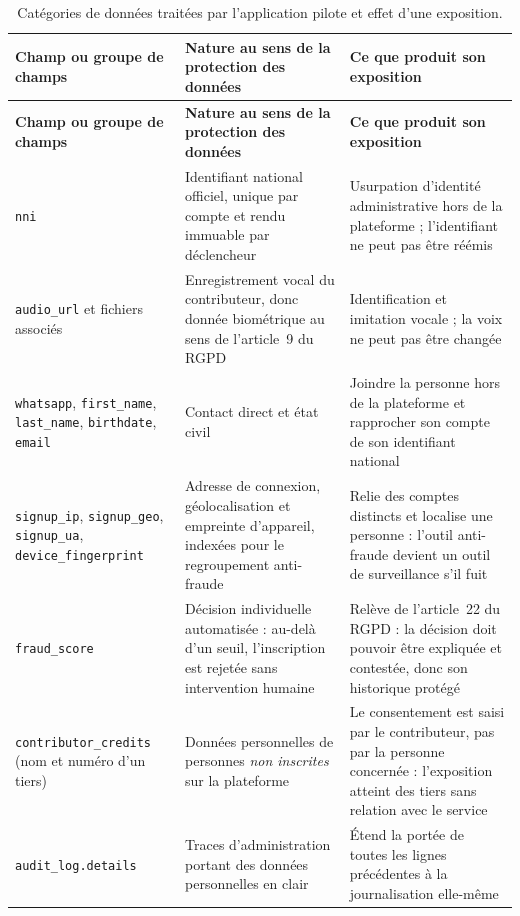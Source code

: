 {\setlength{\tabcolsep}{3pt}
\setlength{\LTpre}{4pt}\setlength{\LTpost}{4pt}
\begin{longtable}{|P{3.3cm}|P{4.3cm}|P{7.7cm}|}
\caption{Catégories de données traitées par l'application pilote et effet d'une exposition.}
\label{tab:sensibilite-elson}\\
\hline
\textbf{Champ ou groupe de champs} & \textbf{Nature au sens de la protection des données} &
  \textbf{Ce que produit son exposition} \\
\hline
\endfirsthead
\hline
\textbf{Champ ou groupe de champs} & \textbf{Nature au sens de la protection des données} &
  \textbf{Ce que produit son exposition} \\
\hline
\endhead
\hline
\endfoot
\texttt{nni} & Identifiant national officiel, unique par compte et rendu immuable par
déclencheur & Usurpation d'identité administrative hors de la plateforme ; l'identifiant ne
peut pas être réémis \\ \hline
\texttt{audio\_url} et fichiers associés & Enregistrement vocal du contributeur, donc donnée
biométrique au sens de l'article~9 du RGPD & Identification et imitation vocale ; la voix ne
peut pas être changée \\ \hline
\texttt{whatsapp}, \texttt{first\_name}, \texttt{last\_name}, \texttt{birthdate},
\texttt{email} & Contact direct et état civil & Joindre la personne hors de la plateforme et
rapprocher son compte de son identifiant national \\ \hline
\texttt{signup\_ip}, \texttt{signup\_geo}, \texttt{signup\_ua},
\texttt{device\_fingerprint} & Adresse de connexion, géolocalisation et empreinte d'appareil,
indexées pour le regroupement anti-fraude & Relie des comptes distincts et localise une
personne : l'outil anti-fraude devient un outil de surveillance s'il fuit \\ \hline
\texttt{fraud\_score} & Décision individuelle automatisée : au-delà d'un seuil, l'inscription
est rejetée sans intervention humaine & Relève de l'article~22 du RGPD : la décision doit
pouvoir être expliquée et contestée, donc son historique protégé \\ \hline
\texttt{contributor\_credits} (nom et numéro d'un tiers) & Données personnelles de personnes
\emph{non inscrites} sur la plateforme & Le consentement est saisi par le contributeur, pas
par la personne concernée : l'exposition atteint des tiers sans relation avec le service
\\ \hline
\texttt{audit\_log.details} & Traces d'administration portant des données personnelles en
clair & Étend la portée de toutes les lignes précédentes à la journalisation elle-même \\
\end{longtable}
}

